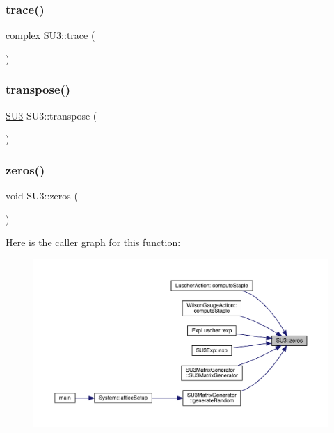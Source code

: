 \subsubsection{\texorpdfstring{trace()}{trace()}}
{\footnotesize\ttfamily \mbox{\hyperlink{classcomplex}{complex}} S\+U3\+::trace (\begin{DoxyParamCaption}{ }\end{DoxyParamCaption})}

\mbox{\label{class_s_u3_af0229a4940c6c4355a2994ccaa663d0e}} 
\subsubsection{\texorpdfstring{transpose()}{transpose()}}
{\footnotesize\ttfamily \mbox{\hyperlink{class_s_u3}{S\+U3}} S\+U3\+::transpose (\begin{DoxyParamCaption}{ }\end{DoxyParamCaption})}

\mbox{\label{class_s_u3_a9f3527fd882882ddfa18d72f5f43176c}} 
\subsubsection{\texorpdfstring{zeros()}{zeros()}}
{\footnotesize\ttfamily void S\+U3\+::zeros (\begin{DoxyParamCaption}{ }\end{DoxyParamCaption})}

Here is the caller graph for this function\+:
\nopagebreak
\begin{figure}[H]
\begin{center}
\leavevmode
\includegraphics[width=350pt]{class_s_u3_a9f3527fd882882ddfa18d72f5f43176c_icgraph}
\end{center}
\end{figure}


